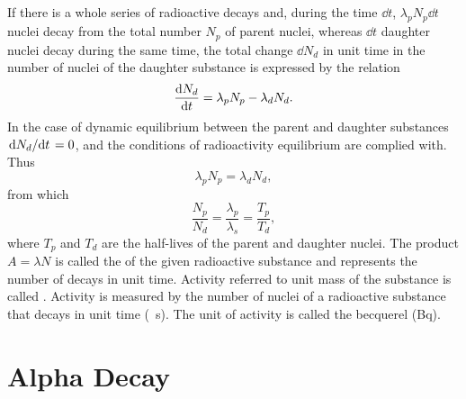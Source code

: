 \subsection{}\label{42.4.8} If there is a whole series of radioactive decays and, during the time $\dd t$, $\lambda_{p}N_{p} \dd t$ nuclei decay from the total number $N_{p}$ of parent nuclei, whereas $\dd t$ daughter nuclei decay during the same time, the total change $\dd N_{d}$ in unit time in the number of nuclei of the daughter substance is expressed by the relation
\begin{equation*}%
\dv{N_{d}}{t}   = \lambda_{p}N_{p} - \lambda_{d}N_{d}.
 \end{equation*}
In the case of dynamic equilibrium between the parent and daughter substances $\dv*{N_{d}}{t}  = 0$, and the conditions of radioactivity equilibrium are complied with. Thus
\begin{equation*}%
\lambda_{p}N_{p} = \lambda_{d}N_{d},
\end{equation*}
from which
\begin{equation*}%
\frac{N_{p}}{N_{d}} = \frac{\lambda_{p}}{\lambda_{s}} = \frac{T_{p}}{T_{d}},
\end{equation*}
where $T_{p}$ and $T_{d}$ are the half-lives  of the parent and daughter nuclei. The product $A = \lambda N$ is called the  of the given radioactive substance and represents the number of decays in unit time. Activity referred to unit mass of the substance is called . Activity is measured by the number of nuclei of a radioactive substance that decays in unit time (\si{\per\second}). The unit of activity is called the becquerel (\si{\becquerel}).

\section{ Alpha Decay}
\label{sec-42.5} 


